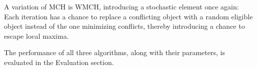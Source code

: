 A variation of MCH is WMCH, introducing a stochastic element once again: Each iteration has a chance to replace a conflicting object with a random eligible object instead of the one minimizing conflicts, thereby introducing a chance to escape local maxima.\cite{KapKis}

The performance of all three algorithms, along with their parameters, is evaluated in the Evaluation section.